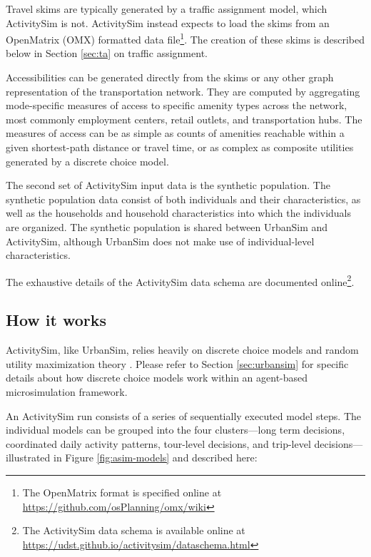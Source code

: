 Travel skims are typically generated by a traffic assignment model, which ActivitySim is not. ActivitySim instead expects to load the skims from an OpenMatrix (OMX) formatted data file\footnote{The OpenMatrix format is specified online at \url{https://github.com/osPlanning/omx/wiki}}. The creation of these skims is described below in Section \ref{sec:ta} on traffic assignment.

Accessibilities can be generated directly from the skims or any other graph representation of the transportation network. They are computed by aggregating mode-specific measures of access to specific amenity types across the network, most commonly employment centers, retail outlets, and transportation hubs. The measures of access can be as simple as counts of amenities reachable within a given shortest-path distance or travel time, or as complex as composite utilities generated by a discrete choice model. 

The second set of ActivitySim input data is the synthetic population. The synthetic population data consist of both individuals and their characteristics, as well as the households and household characteristics into which the individuals are organized. The synthetic population is shared between UrbanSim and ActivitySim, although UrbanSim does not make use of individual-level characteristics.

The exhaustive details of the ActivitySim data schema are documented online\footnote{The ActivitySim data schema is available online at \url{https://udst.github.io/activitysim/dataschema.html}}.

\subsection{How it works}

ActivitySim, like UrbanSim, relies heavily on discrete choice models and random utility maximization theory \citep{mcfadden-1974}. Please refer to Section \ref{sec:urbansim} for specific details about how discrete choice models work within an agent-based microsimulation framework.

An ActivitySim run consists of a series of sequentially executed model steps. The individual models can be grouped into the four clusters---long term decisions, coordinated daily activity patterns, tour-level decisions, and trip-level decisions---illustrated in Figure \ref{fig:asim-models} and described here:

